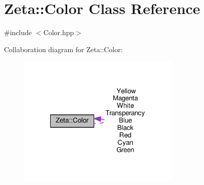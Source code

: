 \hypertarget{classZeta_1_1Color}{\section{Zeta\+:\+:Color Class Reference}
\label{classZeta_1_1Color}
}


{\ttfamily \#include $<$Color.\+hpp$>$}



Collaboration diagram for Zeta\+:\+:Color\+:\nopagebreak
\begin{figure}[H]
\begin{center}
\leavevmode
\includegraphics[width=222pt]{classZeta_1_1Color__coll__graph}
\end{center}
\end{figure}
